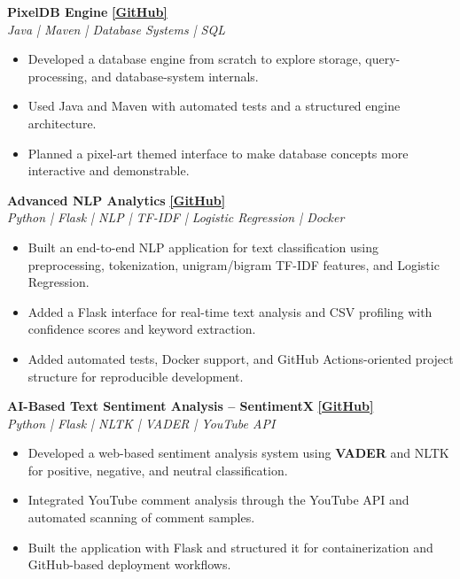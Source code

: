 \documentclass[10pt,a4paper]{article}
\newcommand{\resumeProject}[3]{
    \textbf{#1}
    \hfill
    \href{#3}{\textbf{[GitHub]}}
    \\
    \textit{#2}
    \vspace{1pt}
}
\newcommand{\resumeProjectEnd}{
    \vspace{3pt}
}
\begin{document}
\resumeProject
{PixelDB Engine}
{Java | Maven | Database Systems | SQL}
{https://github.com/BijoySarkar19/PixelDB}

\begin{itemize}[leftmargin=14pt, itemsep=1pt, topsep=1pt]
    \item Developed a database engine from scratch to explore storage, query-processing, and database-system internals.
    \item Used Java and Maven with automated tests and a structured engine architecture.
    \item Planned a pixel-art themed interface to make database concepts more interactive and demonstrable.
\end{itemize}
\resumeProjectEnd

\newpage

\resumeProject
{Advanced NLP Analytics}
{Python | Flask | NLP | TF-IDF | Logistic Regression | Docker}
{https://github.com/BijoySarkar19/advanced-nlp-analytics}

\begin{itemize}[leftmargin=14pt, itemsep=1pt, topsep=1pt]
    \item Built an end-to-end NLP application for text classification using preprocessing, tokenization, unigram/bigram TF-IDF features, and Logistic Regression.
    \item Added a Flask interface for real-time text analysis and CSV profiling with confidence scores and keyword extraction.
    \item Added automated tests, Docker support, and GitHub Actions-oriented project structure for reproducible development.
\end{itemize}
\resumeProjectEnd

\resumeProject
{AI-Based Text Sentiment Analysis -- SentimentX}
{Python | Flask | NLTK | VADER | YouTube API}
{https://github.com/BijoySarkar19/SentimentX-AI-Sentiment-Analysis}

\begin{itemize}[leftmargin=14pt, itemsep=1pt, topsep=1pt]
    \item Developed a web-based sentiment analysis system using \textbf{VADER} and NLTK for positive, negative, and neutral classification.
    \item Integrated YouTube comment analysis through the YouTube API and automated scanning of comment samples.
    \item Built the application with Flask and structured it for containerization and GitHub-based deployment workflows.
\end{itemize}
\resumeProjectEnd
\end{document}
